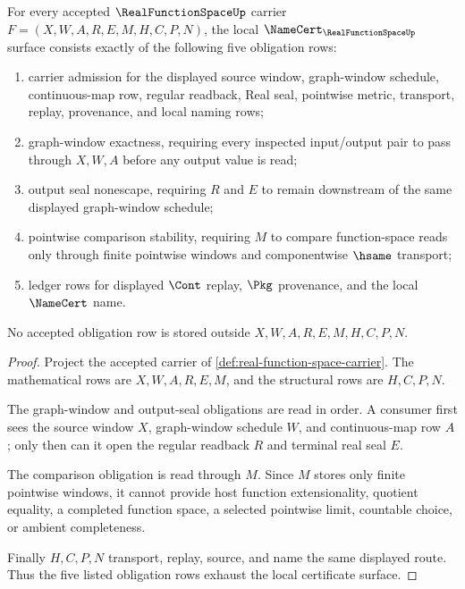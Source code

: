 \begin{theorem}\label{thm:real-function-space-namecert-obligations}
For every accepted $\RealFunctionSpaceUp$ carrier $F=(X,W,A,R,E,M,H,C,P,N)$, the local $\NameCert_{\RealFunctionSpaceUp}$ surface consists exactly of the following five obligation rows:
\begin{enumerate}
\item carrier admission for the displayed source window, graph-window schedule, continuous-map row, regular readback, Real seal, pointwise metric, transport, replay, provenance, and local naming rows;
\item graph-window exactness, requiring every inspected input/output pair to pass through $X,W,A$ before any output value is read;
\item output seal nonescape, requiring $R$ and $E$ to remain downstream of the same displayed graph-window schedule;
\item pointwise comparison stability, requiring $M$ to compare function-space reads only through finite pointwise windows and componentwise $\hsame$ transport;
\item ledger rows for displayed $\Cont$ replay, $\Pkg$ provenance, and the local $\NameCert$ name.
\end{enumerate}
No accepted obligation row is stored outside $X,W,A,R,E,M,H,C,P,N$.
\end{theorem}
\begin{proof}
Project the accepted carrier of \autoref{def:real-function-space-carrier}. The mathematical rows are $X,W,A,R,E,M$, and the structural rows are $H,C,P,N$.

The graph-window and output-seal obligations are read in order. A consumer first sees the source window $X$, graph-window schedule $W$, and continuous-map row $A$; only then can it open the regular readback $R$ and terminal real seal $E$.

The comparison obligation is read through $M$. Since $M$ stores only finite pointwise windows, it cannot provide host function extensionality, quotient equality, a completed function space, a selected pointwise limit, countable choice, or ambient completeness.

Finally $H,C,P,N$ transport, replay, source, and name the same displayed route. Thus the five listed obligation rows exhaust the local certificate surface.
\end{proof}

